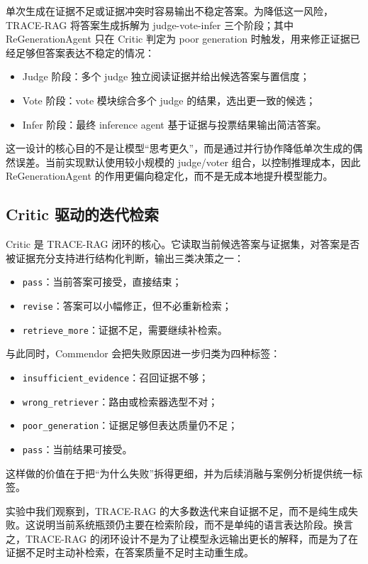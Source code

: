 ﻿\documentclass[UTF8,11pt,twocolumn]{ctexart}
\begin{document}
单次生成在证据不足或证据冲突时容易输出不稳定答案。为降低这一风险，TRACE-RAG 将答案生成拆解为 judge-vote-infer 三个阶段；其中 ReGenerationAgent 只在 Critic 判定为 poor generation 时触发，用来修正证据已经足够但答案表达不稳定的情况：

\begin{itemize}[leftmargin=1.5em]
  \item Judge 阶段：多个 judge 独立阅读证据并给出候选答案与置信度；
  \item Vote 阶段：vote 模块综合多个 judge 的结果，选出更一致的候选；
  \item Infer 阶段：最终 inference agent 基于证据与投票结果输出简洁答案。
\end{itemize}

这一设计的核心目的不是让模型“思考更久”，而是通过并行协作降低单次生成的偶然误差。当前实现默认使用较小规模的 judge/voter 组合，以控制推理成本，因此 ReGenerationAgent 的作用更偏向稳定化，而不是无成本地提升模型能力。

\subsection{Critic 驱动的迭代检索}

Critic 是 TRACE-RAG 闭环的核心。它读取当前候选答案与证据集，对答案是否被证据充分支持进行结构化判断，输出三类决策之一：

\begin{itemize}[leftmargin=1.5em]
  \item \texttt{pass}：当前答案可接受，直接结束；
  \item \texttt{revise}：答案可以小幅修正，但不必重新检索；
  \item \texttt{retrieve\_more}：证据不足，需要继续补检索。
\end{itemize}

与此同时，Commendor 会把失败原因进一步归类为四种标签：
\begin{itemize}[leftmargin=1.5em]
  \item \texttt{insufficient\_evidence}：召回证据不够；
  \item \texttt{wrong\_retriever}：路由或检索器选型不对；
  \item \texttt{poor\_generation}：证据足够但表达质量仍不足；
  \item \texttt{pass}：当前结果可接受。
\end{itemize}
这样做的价值在于把“为什么失败”拆得更细，并为后续消融与案例分析提供统一标签。

实验中我们观察到，TRACE-RAG 的大多数迭代来自证据不足，而不是纯生成失败。这说明当前系统瓶颈仍主要在检索阶段，而不是单纯的语言表达阶段。换言之，TRACE-RAG 的闭环设计不是为了让模型永远输出更长的解释，而是为了在证据不足时主动补检索，在答案质量不足时主动重生成。
\end{document}

